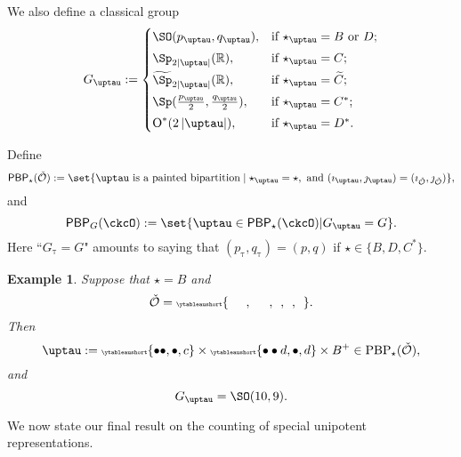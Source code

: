 \documentclass[12pt]{amsart}
\let\ytb=\ytableaushort
\newcommand{\tytb}[1]{{\tiny\ytb{#1}}}
\def\abs#1{\left|{#1}\right|}
\newcommand{\CO}{{\mathcal {O}}}
\newcommand{\oO}{\operatorname{O}}
\newcommand{\R}{\mathbb R}
\numberwithin{equation}{section}
\newtheorem{eg}[thm]{Example}
\theoremstyle{remark}
\def\PBP{\mathsf{PBP}}
\begin{document}
We also define a classical group
\begin{equation*}%
  G_\uptau:=
  \begin{cases}
    \SO(p_\uptau, q_\uptau), &\hbox{if $\star_\uptau=B$ or $D$}; \smallskip\\
    \Sp_{2\abs{\uptau}}(\R), &\hbox{if $\star_\uptau=C$}; \smallskip\\
    \widetilde{\Sp}_{2\abs{\uptau}}(\R), &\hbox{if $\star_\uptau=\widetilde{ C}$}; \smallskip \\
    \Sp(\frac{p_\uptau}{2}, \frac{q_\uptau}{2}), &\hbox{if $\star_\uptau=C^*$}; \smallskip \\
    \oO^*(2\abs{\uptau}), &\hbox{if $\star_\uptau=D^*$}.\\
  \end{cases}
\end{equation*}


Define
\begin{equation}\label{defpbp2222}
  \PBP_\star(\check \CO) :=\set{ \uptau\textrm{ is a painted
      bipartition} \mid \star_\uptau = \star, \text{ and
    } (\imath_\uptau,\jmath_\uptau) = (\imath_{\check \CO}, \jmath_{\check \CO})},
\end{equation}
and
\begin{equation*} %
    \PBP_{G}(\ckcO) :=\set{\uptau\in \PBP_{\star}(\ckcO)| G_{\uptau} = G}.
\end{equation*}
Here ``$G_{\uptau} = G$" amounts to saying that $(p_\uptau, q_\uptau)=(p,q)$ if $\star\in \{B, D, C^*\}$.
\delete{
  \[
    \begin{array}{rl}
      \mathrm{PBP}_\star(\check \CO):=\{ &
                                           \tau\textrm{ is a painted bipartition}  \mid    \star_\tau = \star,
                                           \text{ and } \\  & (\imath_\tau,\jmath_\tau) = (\imath_{\check \CO}, \jmath_{\check \CO})\}.
    \end{array}
  \]
}


\begin{eg} Suppose that $\star=B$ and
  \[
    \check \CO =\tytb{\ \ \ \ \ \ , \ \ \ \ \ \ , \ \ , \ \ , \ \ }.
  \]
  Then
  \[
    \uptau:= \tytb{\bullet \bullet ,\bullet , c } \times \tytb{\bullet \bullet d ,\bullet , d }\times B^+\in \mathrm{PBP}_{\star}(\check \CO),
  \]
  and
  \[
    G_\uptau=\SO(10,9).
  \]
\end{eg}


We now state our final result on the counting of special unipotent representations.
\end{document}
